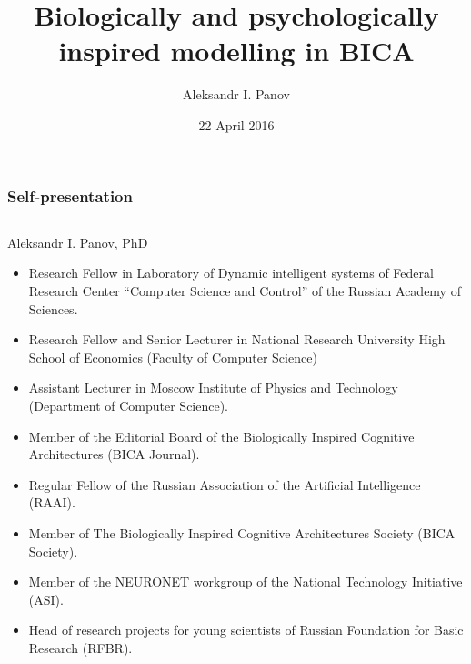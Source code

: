 \documentclass[default]{beamer}
\begin{document}
	
	\title[Bio- and psycho-inspired modelling]{Biologically and psychologically inspired modelling in BICA}
	\author[Panov]{Aleksandr I. Panov}
	\date{22 April 2016} 
	
	\begin{frame}
		\titlepage
	\end{frame}

	\begin{frame}
		\frametitle{Self-presentation}
		\scriptsize
		\begin{columns}
			\begin{column}{0.85\textwidth}
				Aleksandr I. Panov, PhD
				\begin{itemize}
					\item Research Fellow in Laboratory of Dynamic intelligent systems of Federal Research Center ``Computer Science and Control'' of the	Russian Academy of Sciences.
					\item Research Fellow and Senior Lecturer in National Research University High School of Economics (Faculty of Computer Science)
					\item Assistant Lecturer in Moscow Institute of Physics and Technology (Department of Computer Science).
					\item Member of the Editorial Board of the Biologically Inspired Cognitive
					Architectures (BICA Journal).
					\item Regular Fellow of the Russian Association of the Artificial Intelligence (RAAI).
					\item Member of The Biologically Inspired Cognitive Architectures Society (BICA Society).
					\item Member of the NEURONET workgroup of the National Technology Initiative (ASI).
					\item Head of research projects for young scientists of Russian Foundation for Basic Research (RFBR).
				\end{itemize}
			\end{column}
			

\end{columns}
\end{frame}
\end{document}
